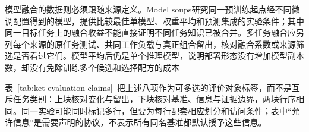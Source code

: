 \begin{samepage}
模型融合的数据则必须跟随来源定义。Model soups研究同一预训练起点经不同微调配置得到的模型，提供比较最佳单模型、权重平均和预测集成的实验条件；其中同一目标任务上的融合收益不能直接证明不同任务知识已被合并。多任务融合应另列每个来源的原任务测试、共同工作负载与真正组合留出，核对融合系数或来源筛选是否看过它们。模型平均后仍是单个推理模型，说明部署形态没有增加模型副本数，却没有免除训练多个候选和选择配方的成本

\end{samepage}

表~\ref{tab:ket-evaluation-claims}~把上述八项作为可多选的评价对象标签，而不是互斥任务类别：上块核对变化与留出，下块核对基准、信息与证据边界，两块行序相同。同一实验可能同时标记多行，但要为每行配套相应划分和访问条件；表中“允许信息”是需要声明的协议，不表示所有同名基准都默认授予这些信息。

